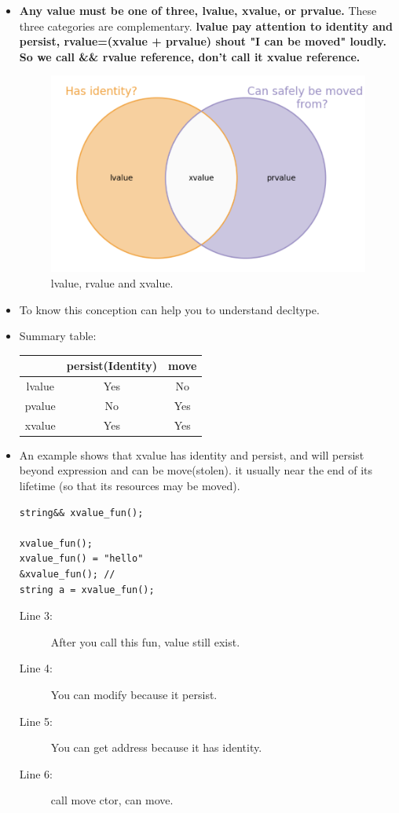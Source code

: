 \documentclass[a4paper,11pt,twoside]{book}
\newcommand{\tophline}{\hline }
\newcommand{\bottomhline}{\\ \hline }
\newcommand{\tophline}{ }
\newcommand{\bottomhline}{ }
\begin{document}
\begin{itemize}
	\item \textbf{Any value must be one of three, lvalue, xvalue, or prvalue.} These three categories are complementary.  \textbf{lvalue pay attention to  identity and persist, rvalue=(xvalue + prvalue) shout "I can be moved" loudly.  So we call \&\& rvalue reference, don't call it xvalue reference. }
	
	\begin{figure}[h]
		\centering
		\includegraphics[width=0.4\linewidth]{pics/xvalue1.png}
		\caption{lvalue, rvalue and xvalue.}
		\label{fig:xvalue1}
	\end{figure}
	
	
	\item To know this conception can help you to understand decltype. 
	
	\item Summary table: 
	\begin{center}
		\begin{tabular}{|c|c|c|}
			\tophline
			& persist(Identity) & move \\
			\tophline
			lvalue & Yes & No \\
			\tophline
			pvalue & No & Yes \\
			\tophline
			xvalue & Yes & Yes \bottomhline
		\end{tabular}
	\end{center}
	

\item An example shows that xvalue has identity and persist, and will persist beyond expression and can be move(stolen). it usually near the end of its lifetime (so that its resources may be moved).
\begin{lstlisting}
string&& xvalue_fun();

xvalue_fun(); 
xvalue_fun() = "hello" 
&xvalue_fun(); //
string a = xvalue_fun(); 
\end{lstlisting}
\begin{description}
	\item[Line 3:] After you call this fun, value still exist.
	\item[Line 4:] You can modify because it persist.
	\item[Line 5:] You can get address because it has identity.
	\item[Line 6:] call move ctor, can move.
\end{description}


\end{itemize}
\end{document}
